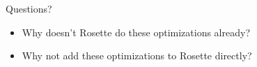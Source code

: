 \documentclass[10pt,aspectratio=169]{beamer}
\begin{document}
\begin{frame}[standout]
\label{06_questions}
    \begin{minipage}[c][0.5\paperheight]{\textwidth}
    \begin{center}
        {\Huge Questions?}
    \end{center}
    \end{minipage}

    \begin{center}
        \begin{itemize}
            \item Why doesn't Rosette do these optimizations already?
            \item Why not add these optimizations to Rosette directly?
        \end{itemize}
    \end{center}

\end{frame}

\appendix

\turnipbibframe{}

\end{document}
